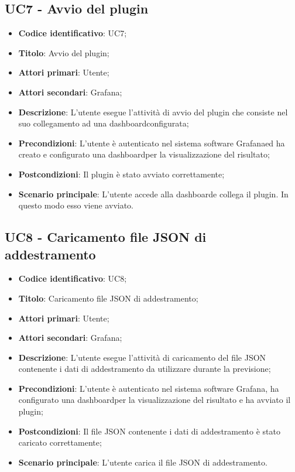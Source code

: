 \subsection{UC7 - Avvio del plugin}
\begin{itemize}
	\item \textbf{Codice identificativo}: UC7;
	\item \textbf{Titolo}: Avvio del plugin;
	\item \textbf{Attori primari}: Utente;
	\item \textbf{Attori secondari}: Grafana\glo;
	\item \textbf{Descrizione}: L'utente esegue l'attività di avvio del plugin che consiste nel suo collegamento ad una dashboard\glosp configurata;
	\item \textbf{Precondizioni}: L'utente è autenticato nel sistema software Grafana\glosp ed ha creato e configurato una dashboard\glosp per la visualizzazione del risultato;
	\item \textbf{Postcondizioni}: Il plugin è stato avviato correttamente;
	\item \textbf{Scenario principale}: L'utente accede alla dashboard\glosp e collega il plugin. In questo modo esso viene avviato.
\end{itemize}

\subsection{UC8 - Caricamento file JSON di addestramento}
\begin{itemize}
	\item \textbf{Codice identificativo}: UC8;
	\item \textbf{Titolo}: Caricamento file JSON di addestramento;
	\item \textbf{Attori primari}: Utente;
	\item \textbf{Attori secondari}: Grafana\glo;
	\item \textbf{Descrizione}: L'utente esegue l'attività di caricamento del file JSON contenente i dati di addestramento da utilizzare durante la previsione;
	\item \textbf{Precondizioni}: L'utente è autenticato nel sistema software Grafana\glosp, ha configurato una dashboard\glosp per la visualizzazione del risultato e ha avviato il plugin;
	\item \textbf{Postcondizioni}: Il file JSON contenente i dati di addestramento è stato caricato correttamente;
	\item \textbf{Scenario principale}: L'utente carica il file JSON di addestramento.
\end{itemize}

